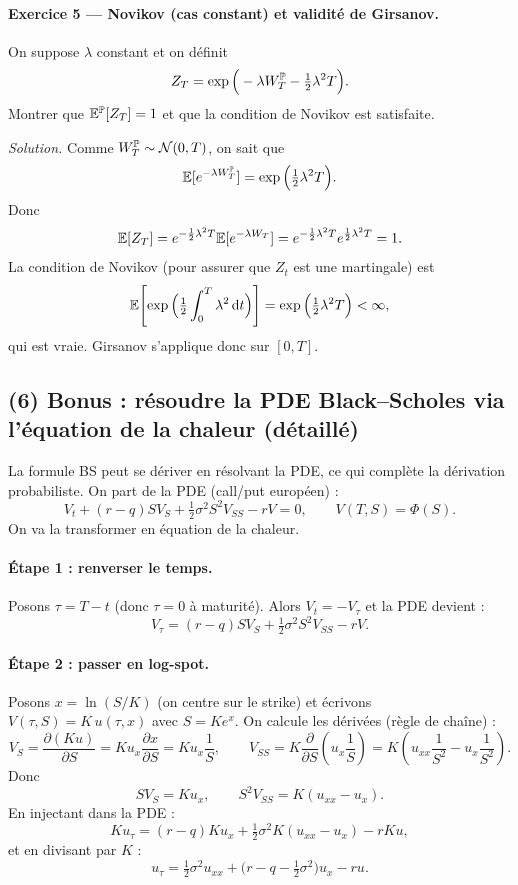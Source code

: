 \paragraph{Exercice 5 --- Novikov (cas constant) et validité de Girsanov.}
On suppose $\lambda$ constant et on définit
\[
Z_T=\exp\Big(-\lambda W_T^{\mathbb{P}}-\tfrac12\lambda^2T\Big).
\]
Montrer que $\mathbb{E}^{\mathbb{P}}[Z_T]=1$ et que la condition de Novikov est satisfaite.

\emph{Solution.}
Comme $W_T^{\mathbb{P}}\sim\mathcal{N}(0,T)$, on sait que
\[
\mathbb{E}[e^{-\lambda W_T^{\mathbb{P}}}]=\exp\Big(\tfrac12\lambda^2T\Big).
\]
Donc
\[
\mathbb{E}[Z_T]=e^{-\frac12\lambda^2T}\mathbb{E}[e^{-\lambda W_T}]
=e^{-\frac12\lambda^2T}e^{\frac12\lambda^2T}=1.
\]
La condition de Novikov (pour assurer que $Z_t$ est une martingale) est
\[
\mathbb{E}\!\left[\exp\Big(\tfrac12\int_0^T \lambda^2\,\mathrm{d} t\Big)\right]
=\exp\Big(\tfrac12\lambda^2T\Big)<\infty,
\]
qui est vraie. Girsanov s'applique donc sur $[0,T]$.

\subsection*{(6) Bonus : résoudre la PDE Black--Scholes via l'équation de la chaleur (détaillé)}
La formule BS peut se dériver en résolvant la PDE, ce qui complète la dérivation probabiliste.
On part de la PDE (call/put européen) :
\[
V_t+(r-q)SV_S+\tfrac12\sigma^2S^2V_{SS}-rV=0,\qquad V(T,S)=\Phi(S).
\]
On va la transformer en équation de la chaleur.

\paragraph{Étape 1 : renverser le temps.}
Posons $\tau=T-t$ (donc $\tau=0$ à maturité). Alors $V_t=-V_\tau$ et la PDE devient :
\[
V_\tau=(r-q)SV_S+\tfrac12\sigma^2S^2V_{SS}-rV.
\]

\paragraph{Étape 2 : passer en log-spot.}
Posons $x=\ln(S/K)$ (on centre sur le strike) et écrivons $V(\tau,S)=K\,u(\tau,x)$ avec $S=Ke^x$.
On calcule les dérivées (règle de chaîne) :
\[
V_S=\frac{\partial (K u)}{\partial S}=K u_x\frac{\partial x}{\partial S}=K u_x\frac{1}{S},
\qquad
V_{SS}=K\frac{\partial}{\partial S}\!\left(u_x\frac{1}{S}\right)
=K\left(u_{xx}\frac{1}{S^2}-u_x\frac{1}{S^2}\right).
\]
Donc
\[
SV_S=K u_x,\qquad S^2V_{SS}=K(u_{xx}-u_x).
\]
En injectant dans la PDE :
\[
K u_\tau=(r-q)K u_x+\tfrac12\sigma^2K(u_{xx}-u_x)-rKu,
\]
et en divisant par $K$ :
\[
u_\tau=\tfrac12\sigma^2u_{xx}+\Big(r-q-\tfrac12\sigma^2\Big)u_x-r u.
\]

